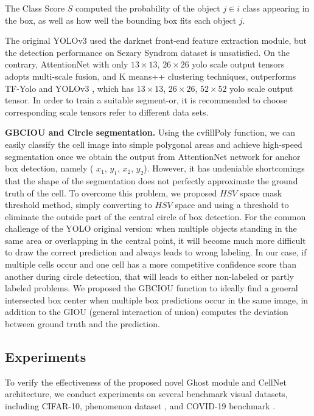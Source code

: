 The Class Score $S$ computed the probability of the object $j \in  i$ class appearing in the box, as well as how well the bounding box fits each object $j$.

The original YOLOv3\cite{33} used the darknet front-end feature extraction module, but the detection performance on Sezary Syndrom dataset is unsatisfied. On the contrary, AttentionNet with only $13 \times 13$, $26 \times 26$ yolo scale output tensors adopts multi-scale fusion, and K means++ clustering\cite{18} techniques, outperforms TF-Yolo\cite{18} and  YOLOv3 \cite{33}, which has $13 \times 13$, $26 \times 26$, $52 \times 52$ yolo scale output tensor. In order to train a suitable segment-or, it is recommended to choose corresponding scale tensors refer to different data sets. 

\textbf{GBCIOU and Circle segmentation.} Using the cvfillPoly function, we can easily classify the cell image into simple polygonal areas and achieve high-speed segmentation once we obtain the output from AttentionNet network for anchor box detection, namely ( $x_{1}$, $y_{1}$, $x_{2}$, $y_{2}$). However, it has undeniable shortcomings that the shape of the segmentation does not perfectly approximate the ground truth of the cell. To overcome this problem, we proposed $HSV$ space mask threshold method, simply converting to $HSV$ space and using a threshold to eliminate the outside part of the central circle of box detection.  For the common challenge of the YOLO original version: when multiple objects standing in the same area or overlapping in the central point, it will become much more difficult to draw the correct prediction and always leads to wrong labeling. In our case, if multiple cells occur and one cell has a more competitive confidence score than another during circle detection, that will leads to either non-labeled or partly labeled problems.
We proposed the GBCIOU function to ideally find a general intersected box center when multiple box predictions occur in the same image, in addition to the GIOU (general interaction of union) computes the deviation between ground truth and the prediction.





\subsection{Experiments}
To verify the effectiveness of the proposed novel Ghost module and CellNet architecture, we conduct experiments on several benchmark visual datasets, including CIFAR-10\cite{21}, phenomenon dataset \cite{38}, and COVID-19 benchmark \cite{36}\cite{37}. 


